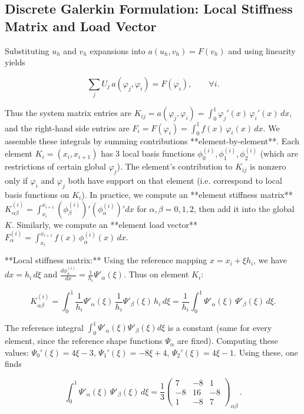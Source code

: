 \documentclass[a4paper,10pt]{article}
\begin{document}
\subsection{Discrete Galerkin Formulation: Local Stiffness Matrix and Load Vector}

Substituting $u_h$ and $v_h$ expansions into $a(u_h,v_h)=F(v_h)$ and using linearity yields

$$
    \sum_{j} U_j\,a(\varphi_j,\varphi_i) = F(\varphi_i), \qquad \forall i.
$$

Thus the system matrix entries are $K_{ij} = a(\varphi_j,\varphi_i) = \int_0^1 \varphi_j'(x)\,\varphi_i'(x)\,dx$, and the right-hand side entries are $F_i = F(\varphi_i) = \int_0^1 f(x)\,\varphi_i(x)\,dx$. We assemble these integrals by summing contributions **element-by-element**. Each element $K_i=(x_i,x_{i+1})$ has 3 local basis functions $\phi_0^{(i)},\phi_1^{(i)},\phi_2^{(i)}$ (which are restrictions of certain global $\varphi_j$). The element’s contribution to $K_{ij}$ is nonzero only if $\varphi_i$ and $\varphi_j$ both have support on that element (i.e. correspond to local basis functions on $K_i$). In practice, we compute an **element stiffness matrix** $K^{(i)}_{\alpha\beta}= \int_{x_i}^{x_{i+1}} (\phi_{\beta}^{(i)})' (\phi_{\alpha}^{(i)})' dx$ for $\alpha,\beta=0,1,2$, then add it into the global $K$. Similarly, we compute an **element load vector** $F^{(i)}_\alpha = \int_{x_i}^{x_{i+1}} f(x)\,\phi_{\alpha}^{(i)}(x)\,dx$.

**Local stiffness matrix:** Using the reference mapping $x = x_i + \xi h_i$, we have $dx = h_i\,d\xi$ and $\frac{d\phi_{\alpha}^{(i)}}{dx} = \frac{1}{h_i}\Psi'_\alpha(\xi)$. Thus on element $K_i$:

$$
    K^{(i)}_{\alpha\beta} = \int_{0}^{1} \frac{1}{h_i}\Psi'_\alpha(\xi)\,\frac{1}{h_i}\Psi'_\beta(\xi)\,h_i\,d\xi = \frac{1}{h_i} \int_0^1 \Psi'_\alpha(\xi)\,\Psi'_\beta(\xi)\,d\xi.
$$

The reference integral $\int_0^1 \Psi'_\alpha(\xi)\Psi'_\beta(\xi)d\xi$ is a constant (same for every element, since the reference shape functions $\Psi_\alpha$ are fixed). Computing these values: $\Psi_0'(\xi)=4\xi-3$, $\Psi_1'(\xi)=-8\xi+4$, $\Psi_2'(\xi)=4\xi-1$. 
Using these, one finds

$$
\int_0^1 \Psi'_\alpha(\xi)\,\Psi'_\beta(\xi)\,d\xi = \frac{1}{3}
\begin{pmatrix} 7 & -8 & 1\\ -8 & 16 & -8 \\ 1 & -8 & 7
\end{pmatrix}_{\!\alpha\beta}\,.
$$
\end{document}
